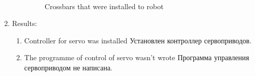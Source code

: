 \begin{enumerate}
\begin{enumerate}
      \begin{figure}[H]
      	\begin{minipage}[h]{1\linewidth}
      		\caption{Crossbars that were installed to robot} 
      	\end{minipage}
      \end{figure}
      
    \end{enumerate}
    
	\item Results: 
	\begin{enumerate}
	  \item Controller for servo was installed Установлен контроллер сервоприводов.
	  
      \item The programme of control of servo wasn't wrote Программа управления сервоприводом не написана.
      

\end{enumerate}
\end{enumerate}
